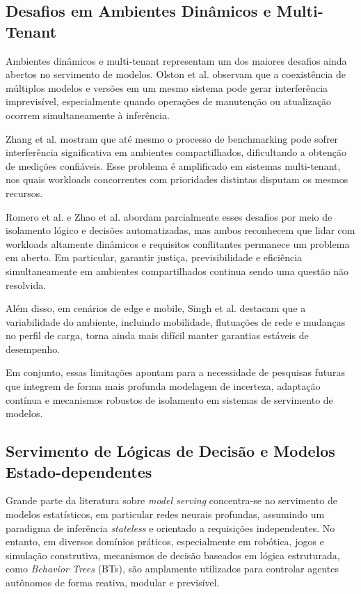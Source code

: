 \subsection{Desafios em Ambientes Dinâmicos e Multi-Tenant}
Ambientes dinâmicos e multi-tenant representam um dos maiores desafios ainda abertos no servimento de modelos. Olston et al. observam que a coexistência de múltiplos modelos e versões em um mesmo sistema pode gerar interferência imprevisível, especialmente quando operações de manutenção ou atualização ocorrem simultaneamente à inferência.

Zhang et al. mostram que até mesmo o processo de benchmarking pode sofrer interferência significativa em ambientes compartilhados, dificultando a obtenção de medições confiáveis. Esse problema é amplificado em sistemas multi-tenant, nos quais workloads concorrentes com prioridades distintas disputam os mesmos recursos.

Romero et al. e Zhao et al. abordam parcialmente esses desafios por meio de isolamento lógico e decisões automatizadas, mas ambos reconhecem que lidar com workloads altamente dinâmicos e requisitos conflitantes permanece um problema em aberto. Em particular, garantir justiça, previsibilidade e eficiência simultaneamente em ambientes compartilhados continua sendo uma questão não resolvida.

Além disso, em cenários de edge e mobile, Singh et al. destacam que a variabilidade do ambiente, incluindo mobilidade, flutuações de rede e mudanças no perfil de carga, torna ainda mais difícil manter garantias estáveis de desempenho.

Em conjunto, essas limitações apontam para a necessidade de pesquisas futuras que integrem de forma mais profunda modelagem de incerteza, adaptação contínua e mecanismos robustos de isolamento em sistemas de servimento de modelos.

\subsection{Servimento de Lógicas de Decisão e Modelos Estado-dependentes}

Grande parte da literatura sobre \emph{model serving} concentra-se no servimento de modelos estatísticos, em particular redes neurais profundas, assumindo um paradigma de inferência \emph{stateless} e orientado a requisições independentes. No entanto, em diversos domínios práticos, especialmente em robótica, jogos e simulação construtiva, mecanismos de decisão baseados em lógica estruturada, como \emph{Behavior Trees} (BTs), são amplamente utilizados para controlar agentes autônomos de forma reativa, modular e previsível.

